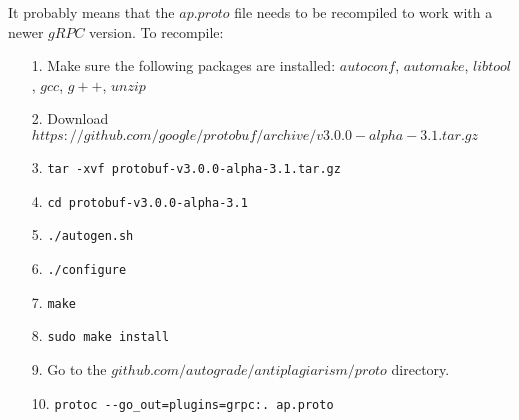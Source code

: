 \documentclass[12pt]{article}
\begin{document}
		It probably means that the $ap.proto$ file needs to be recompiled to work with a newer $gRPC$ version. To recompile:
		
		\begin{itemize}
		\item[1.] Make sure the following packages are installed: $autoconf$, $automake$, $libtool$, $gcc$, $g++$, $unzip$
		\item[2.] Download $https://github.com/google/protobuf/archive/v3.0.0-alpha-3.1.tar.gz$
		\item[3.] \verb|tar -xvf protobuf-v3.0.0-alpha-3.1.tar.gz|
		\item[4.] \verb|cd protobuf-v3.0.0-alpha-3.1|
		\item[5.] \verb|./autogen.sh|
		\item[6.] \verb|./configure|
		\item[7.] \verb|make|
		\item[8.] \verb|sudo make install|
		\item[9.] Go to the $github.com/autograde/antiplagiarism/proto$ directory.
		\item[10.] \verb|protoc --go_out=plugins=grpc:. ap.proto|	
		\end{itemize}
\end{document}
